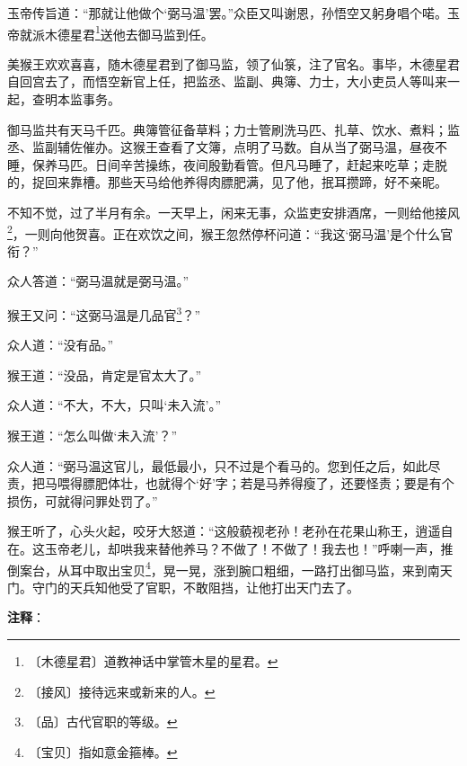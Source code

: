 \documentclass[12pt,UTF-8,openany]{ctexbook}
\begin{document}
\begin{large}
    玉帝传旨道：“那就让他做个‘弼马温’罢。”众臣又叫谢恩，孙悟空又躬身唱个喏。玉帝就派木德星君\footnote{〔木德星君〕道教神话中掌管木星的星君。}送他去御马监到任。
    
    美猴王欢欢喜喜，随木德星君到了御马监，领了仙箓，注了官名。事毕，木德星君自回宫去了，而悟空新官上任，把监丞、监副、典簿、力士，大小吏员人等叫来一起，查明本监事务。
    
    御马监共有天马千匹。典簿管征备草料；力士管刷洗马匹、扎草、饮水、煮料；监丞、监副辅佐催办。这猴王查看了文簿，点明了马数。自从当了弼马温，昼夜不睡，保养马匹。日间辛苦操练，夜间殷勤看管。但凡马睡了，赶起来吃草；走脱的，捉回来靠槽。那些天马给他养得肉膘肥满，见了他，抿耳攒蹄，好不亲昵。
    
    不知不觉，过了半月有余。一天早上，闲来无事，众监吏安排酒席，一则给他接风\footnote{〔接风〕接待远来或新来的人。}，一则向他贺喜。正在欢饮之间，猴王忽然停杯问道：“我这‘弼马温’是个什么官衔？”
    
    众人答道：“弼马温就是弼马温。”
    
    猴王又问：“这弼马温是几品官\footnote{〔品〕古代官职的等级。}？”
    
    众人道：“没有品。”
    
    猴王道：“没品，肯定是官太大了。”
    
    众人道：“不大，不大，只叫‘未入流’。”
    
    猴王道：“怎么叫做‘未入流’？”
    
    众人道：“弼马温这官儿，最低最小，只不过是个看马的。您到任之后，如此尽责，把马喂得膘肥体壮，也就得个‘好’字；若是马养得瘦了，还要怪责；要是有个损伤，可就得问罪处罚了。”
    
    猴王听了，心头火起，咬牙大怒道：“这般藐视老孙！老孙在花果山称王，逍遥自在。这玉帝老儿，却哄我来替他养马？不做了！不做了！我去也！”呼喇一声，推倒案台，从耳中取出宝贝\footnote{〔宝贝〕指如意金箍棒。}，晃一晃，涨到腕口粗细，一路打出御马监，来到南天门。守门的天兵知他受了官职，不敢阻挡，让他打出天门去了。
    
\end{large}


\newpage

\textbf{注释}：

\vspace{-1em}
\end{document}
